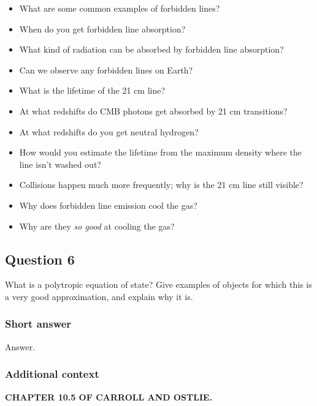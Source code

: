 \documentclass[a4paper,10pt]{article}
\begin{document}
\begin{itemize}
    \item What are some common examples of forbidden lines?
    \item When do you get forbidden line absorption?
    \item What kind of radiation can be absorbed by forbidden line absorption?
    \item Can we observe any forbidden lines on Earth?
    \item What is the lifetime of the 21 cm line?
    \item At what redshifts do CMB photons get absorbed by 21 cm transitions?
    \item At what redshifts do you get neutral hydrogen?
    \item How would you estimate the lifetime from the maximum density where the line isn't washed out?
    \item Collisions happen much more frequently; why is the 21 cm line still visible?
    \item Why does forbidden line emission cool the gas?
    \item Why are they \textit{so good} at cooling the gas?
\end{itemize}


\newpage
\subsection{Question 6}

What is a polytropic equation of state? Give examples of objects for which this is a very good approximation, and explain why it is.

\subsubsection{Short answer}

Answer.

\subsubsection{Additional context}

\textbf{CHAPTER 10.5 OF CARROLL AND OSTLIE.}
\end{document}
